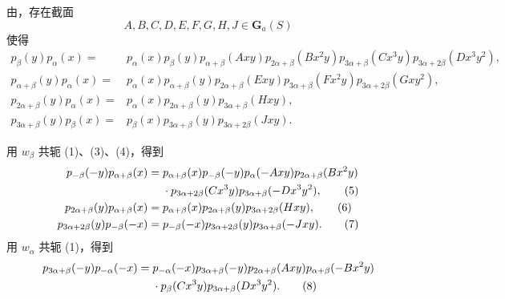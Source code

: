 由，存在截面
\[
  A,B,C,D,E,F,G,H,J\in\mathbf G_a(S)
\]
使得
\begin{align}
 p_\beta(y)p_\alpha(x)
  ={}&p_\alpha(x)p_\beta(y)p_{\alpha+\beta}(Axy)
     p_{2\alpha+\beta}(Bx^2y)p_{3\alpha+\beta}(Cx^3y)
     p_{3\alpha+2\beta}(Dx^3y^2), \tag{1}\label{sga3:XXIII:3.4:eq1}\\
 p_{\alpha+\beta}(y)p_\alpha(x)
  ={}&p_\alpha(x)p_{\alpha+\beta}(y)p_{2\alpha+\beta}(Exy)
     p_{3\alpha+\beta}(Fx^2y)p_{3\alpha+2\beta}(Gxy^2),
     \tag{2}\label{sga3:XXIII:3.4:eq2}\\
 p_{2\alpha+\beta}(y)p_\alpha(x)
  ={}&p_\alpha(x)p_{2\alpha+\beta}(y)p_{3\alpha+\beta}(Hxy),
     \tag{3}\label{sga3:XXIII:3.4:eq3}\\
 p_{3\alpha+\beta}(y)p_\beta(x)
  ={}&p_\beta(x)p_{3\alpha+\beta}(y)p_{3\alpha+2\beta}(Jxy).
     \tag{4}\label{sga3:XXIII:3.4:eq4}
\end{align}

用 \(w_\beta\) 共轭 (1)、(3)、(4)，得到
\begin{align}
 p_{-\beta}(-y)p_{\alpha+\beta}(x)
  ={}&p_{\alpha+\beta}(x)p_{-\beta}(-y)p_\alpha(-Axy)
     p_{2\alpha+\beta}(Bx^2y)\notag\\
    &{}\cdot p_{3\alpha+2\beta}(Cx^3y)
     p_{3\alpha+\beta}(-Dx^3y^2), \tag{5}\label{sga3:XXIII:3.4:eq5}\\
 p_{2\alpha+\beta}(y)p_{\alpha+\beta}(x)
  ={}&p_{\alpha+\beta}(x)p_{2\alpha+\beta}(y)
     p_{3\alpha+2\beta}(Hxy), \tag{6}\label{sga3:XXIII:3.4:eq6}\\
 p_{3\alpha+2\beta}(y)p_{-\beta}(-x)
  ={}&p_{-\beta}(-x)p_{3\alpha+2\beta}(y)
     p_{3\alpha+\beta}(-Jxy). \tag{7}\label{sga3:XXIII:3.4:eq7}
\end{align}
用 \(w_\alpha\) 共轭 (1)，得到
\begin{align}
 p_{3\alpha+\beta}(-y)p_{-\alpha}(-x)
  ={}&p_{-\alpha}(-x)p_{3\alpha+\beta}(-y)
     p_{2\alpha+\beta}(Axy)p_{\alpha+\beta}(-Bx^2y)\notag\\
    &{}\cdot p_\beta(Cx^3y)p_{3\alpha+\beta}(Dx^3y^2).
     \tag{8}\label{sga3:XXIII:3.4:eq8}
\end{align}

